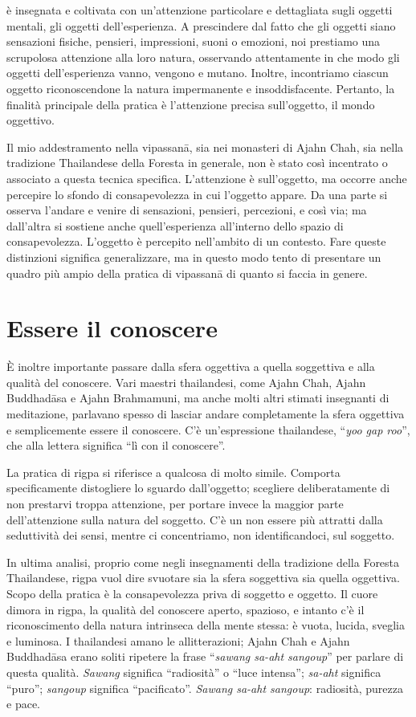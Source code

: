 
 è insegnata e coltivata con un'attenzione particolare e dettagliata sugli oggetti mentali, gli oggetti dell'esperienza. A prescindere dal fatto che gli oggetti siano sensazioni fisiche, pensieri, impressioni, suoni o emozioni, noi prestiamo una scrupolosa attenzione alla loro natura, osservando attentamente in che modo gli oggetti dell'esperienza vanno, vengono e mutano. Inoltre, incontriamo ciascun oggetto riconoscendone la natura impermanente e insoddisfacente. Pertanto, la finalità principale della pratica è l'attenzione precisa sull'oggetto, il mondo oggettivo.

Il mio addestramento nella vipassanā, sia nei monasteri di Ajahn Chah, sia nella tradizione Thailandese della Foresta in generale, non è stato così incentrato o associato a questa tecnica specifica. L'attenzione è sull'oggetto, ma occorre anche percepire lo sfondo di consapevolezza in cui l'oggetto appare. Da una parte si osserva l'andare e venire di sensazioni, pensieri, percezioni, e così via; ma dall'altra si sostiene anche quell'esperienza all'interno dello spazio di consapevolezza. L'oggetto è percepito nell'ambito di un contesto. Fare queste distinzioni significa generalizzare, ma in questo modo tento di presentare un quadro più ampio della pratica di vipassanā di quanto si faccia in genere. 

\section*{Essere il conoscere}

È inoltre importante passare dalla sfera oggettiva a quella soggettiva e alla qualità del conoscere. Vari maestri thailandesi, come Ajahn Chah, Ajahn Buddhadāsa e Ajahn Brahmamuni, ma anche molti altri stimati insegnanti di meditazione, parlavano spesso di lasciar andare completamente la sfera oggettiva e semplicemente essere il conoscere. C'è un'espressione thailandese, ``\textit{yoo gap roo}'', che alla lettera significa ``lì con il conoscere''.

La pratica di rigpa si riferisce a qualcosa di molto simile. Comporta specificamente distogliere lo sguardo dall'oggetto; scegliere deliberatamente di non prestarvi troppa attenzione, per portare invece la maggior parte dell'attenzione sulla natura del soggetto. C'è un non essere più attratti dalla seduttività dei sensi, mentre ci concentriamo, non identificandoci, sul soggetto.

In ultima analisi, proprio come negli insegnamenti della tradizione della Foresta Thailandese, rigpa vuol dire svuotare sia la sfera soggettiva sia quella oggettiva. Scopo della pratica è la consapevolezza priva di soggetto e oggetto. Il cuore dimora in rigpa, la qualità del conoscere aperto, spazioso, e intanto c'è il riconoscimento della natura intrinseca della mente stessa: è vuota, lucida, sveglia e luminosa. I thailandesi amano le allitterazioni; Ajahn Chah e Ajahn Buddhadāsa erano soliti ripetere la frase ``\textit{sawang sa-aht sangoup}'' per parlare di questa qualità. \textit{Sawang} significa ``radiosità'' o ``luce intensa''; \textit{sa-aht} significa ``puro''; \textit{sangoup} significa ``pacificato''. \textit{Sawang sa-aht sangoup}: radiosità, purezza e pace.

